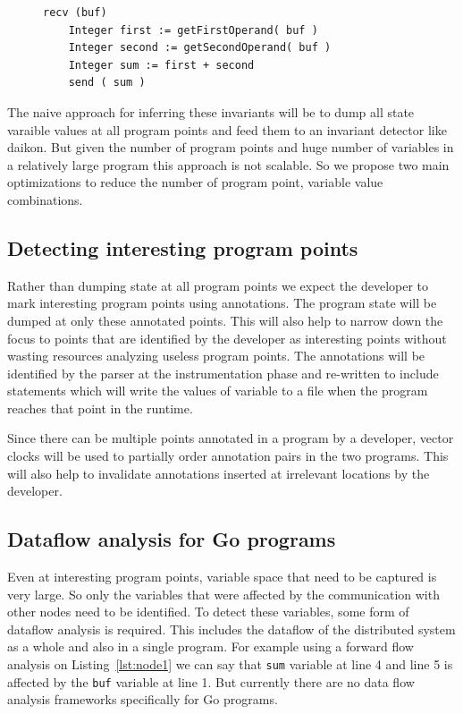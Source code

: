 \begin{figure}
\begin{lstlisting}[caption={Sample code for Communication between 2 nodes - Node 1}, label=lst:node1]
    recv (buf)
    Integer first := getFirstOperand( buf )
    Integer second := getSecondOperand( buf )
    Integer sum := first + second
    send ( sum )
\end{lstlisting}
\end{figure}

The naive approach for inferring these invariants will be to dump all
state varaible values at all program points and feed them to an
invariant detector like daikon\cite{ernst2007daikon}. But given the
number of program points and huge number of variables in a relatively
large program this approach is not scalable. So we propose two main
optimizations to reduce the number of program point, variable value
combinations.

\subsection{Detecting interesting program points}

Rather than dumping state at all program points we expect the
developer to mark interesting program points using annotations. The
program state will be dumped at only these annotated points. This will
also help to narrow down the focus to points that are identified by
the developer as interesting points without wasting resources
analyzing useless program points. The annotations will be identified
by the parser at the instrumentation phase and re-written to include
statements which will write the values of variable to a file when the
program reaches that point in the runtime.

Since there can be multiple points annotated in a program by a
developer, vector clocks will be used to partially order annotation
pairs in the two programs. This will also help to invalidate
annotations inserted at irrelevant locations by the developer.

\subsection{Dataflow analysis for Go programs}

Even at interesting program points, variable space that need to be
captured is very large. So only the variables that were affected by
the communication with other nodes need to be identified. To detect
these variables, some form of dataflow analysis is required. This
includes the dataflow of the distributed system as a whole and also in
a single program. For example using a forward flow analysis on Listing~\ref{lst:node1} we can say that \texttt{sum} variable at line 4 and line 5 is affected by the \texttt{buf} variable at line 1. But currently there are no data flow analysis
frameworks specifically for Go programs.

